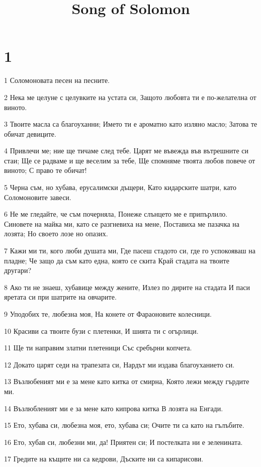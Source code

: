 

\title{Song of Solomon}


\chapter{1}

\par 1 Соломоновата песен на песните.
\par 2 Нека ме целуне с целувките на устата си, Защото любовта ти е по-желателна от виното.
\par 3 Твоите масла са благоуханни; Името ти е ароматно като изляно масло; Затова те обичат девиците.
\par 4 Привлечи ме; ние ще тичаме след тебе. Царят ме въвежда във вътрешните си стаи; Ще се радваме и ще веселим за тебе, Ще спомняме твоята любов повече от виното; С право те обичат!
\par 5 Черна съм, но хубава, ерусалимски дъщери, Като кидарските шатри, като Соломоновите завеси.
\par 6 Не ме гледайте, че съм почерняла, Понеже слънцето ме е припърлило. Синовете на майка ми, като се разгневиха на мене, Поставиха ме пазачка на лозята; Но своето лозе но опазих.
\par 7 Кажи ми ти, кого люби душата ми, Где пасеш стадото си, где го успокояваш на пладне; Че защо да съм като една, която се скита Край стадата на твоите другари?
\par 8 Ако ти не знаеш, хубавице между жените, Излез по дирите на стадата И паси яретата си при шатрите на овчарите.
\par 9 Уподобих те, любезна моя, На конете от Фараоновите колесници.
\par 10 Красиви са твоите бузи с плетенки, И шията ти с огърлици.
\par 11 Ще ти направим златни плетеници Със сребърни копчета.
\par 12 Докато царят седи на трапезата си, Нардът ми издава благоуханието си.
\par 13 Възлюбеният ми е за мене като китка от смирна, Която лежи между гърдите ми.
\par 14 Възлюбленият ми е за мене като кипрова китка В лозята на Енгади.
\par 15 Ето, хубава си, любезна моя, ето, хубава си; Очите ти са като на гълъбите.
\par 16 Ето, хубав си, любезни ми, да! Приятен си; И постелката ни е зеленината.
\par 17 Гредите на къщите ни са кедрови, Дъските ни са кипарисови.

